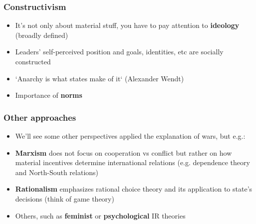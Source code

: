 \documentclass[aspectratio=43]{beamer}
\begin{document}
\begin{frame}
\frametitle{Constructivism}
\centering

\begin{itemize}
  \item<1-> It's not only about material stuff, you have to pay attention to \textbf{ideology} (broadly defined)
  \item<2-> Leaders' self-perceived position and goals, identities, etc are socially constructed
  \item<2-> `Anarchy is what states make of it` (Alexander Wendt)
  \item<3-> Importance of \textbf{norms}
\end{itemize}

\end{frame}

\begin{frame}
\frametitle{Other approaches}
\centering

\begin{itemize}[<+->]
  \item We'll see some other perspectives applied the explanation of wars, but e.g.:
  \item \textbf{Marxism} does not focus on cooperation vs conflict but rather on how material incentives determine international relations (e.g. dependence theory and North-South relations)
  \item \textbf{Rationalism} emphasizes rational choice theory and its application to state's decisions (think of game theory)
  \item Others, such as \textbf{feminist} or \textbf{psychological} IR theories
\end{itemize}

\end{frame}

\end{document}
